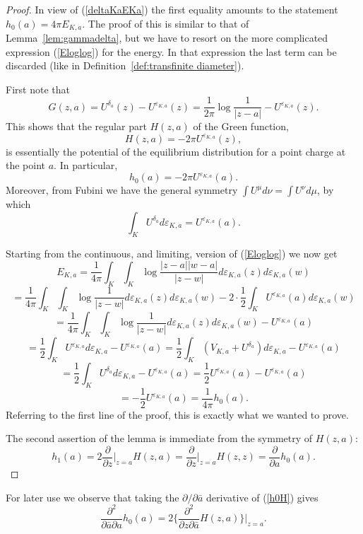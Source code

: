 \documentclass[reqno,12pt]{article}
\theoremstyle{plain}
\theoremstyle{definition}
\numberwithin{equation}{section}
\numberwithin{figure}{section}
\begin{document}
\begin{proof}
In view of (\ref{deltaKaEKa}) the first equality amounts to the statement $h_0(a)=4\pi E_{K,a}$.
The proof of this is similar to that of Lemma~\ref{lem:gammadelta}, but we have to resort on the more complicated
expression (\ref{Eloglog}) for the energy. 
In that expression the last term can be discarded (like in Definition~\ref{def:transfinite diameter}).

First note that
$$
G(z,a)=U^{\delta_a}(z)-U^{\varepsilon_{K,a}}(z)=\frac{1}{2\pi}\log \frac{1}{|z-a|}-U^{\varepsilon_{K,a}}(z).
$$
This shows that the regular part $H(z,a)$ of the Green function, 
\begin{equation}\label{HU}
H(z,a)=-2\pi U^{\varepsilon_{K,a}}(z),
\end{equation}
is essentially the potential of the equilibrium distribution for a point charge at the point $a$. In particular,
$$
h_0(a)=-2\pi U^{\varepsilon_{K,a}}(a).
$$
Moreover, from Fubini we have the general symmetry $\int U^\mu d\nu=\int U^\nu d\mu$, by which
$$
\int_K U^{\delta_a}d\varepsilon_{K,a}
=U^{\varepsilon_{K,a}}(a).
$$ 

Starting from the continuous, and limiting, version of (\ref{Eloglog}) we now get
$$
E_{K,a}=\frac{1}{4\pi}\int_K\int_K \log \frac{|z-a||w-a|}{|z-w|}d\varepsilon_{K,a}(z)d\varepsilon_{K,a}(w)
$$
$$
=\frac{1}{4\pi}\int_K\int_K \log \frac{1}{|z-w|}d\varepsilon_{K,a}(z)d\varepsilon_{K,a}(w)-2\cdot \frac{1}{2} \int_KU^{\varepsilon_{K,a}}(a)d\varepsilon_{K,a}(w)
$$
$$
=\frac{1}{4\pi}\int_K\int_K \log \frac{1}{|z-w|}d\varepsilon_{K,a}(z)d\varepsilon_{K,a}(w)-U^{\varepsilon_{K,a}}(a)
$$
$$
=\frac{1}{2}\int_K U^{\varepsilon_{K,a}}d\varepsilon_{K,a}-U^{\varepsilon_{K,a}}(a)
=\frac{1}{2}\int_K (V_{K,a}+ U^{\delta_a})d\varepsilon_{K,a}-U^{\varepsilon_{K,a}}(a)
$$
$$
=\frac{1}{2}\int_K U^{\delta_a}d\varepsilon_{K,a}-U^{\varepsilon_{K,a}}(a)=\frac{1}{2}U^{\varepsilon_{K,a}}(a)-U^{\varepsilon_{K,a}}(a)
$$
$$
=-\frac{1}{2}U^{\varepsilon_{K,a}}(a)=\frac{1}{4\pi}h_0(a).
$$ 
Referring to the first line of the proof, this is exactly what we wanted to prove.

The second assertion of the lemma is immediate from the symmetry of $H(z,a)$:
\begin{equation}\label{h0H}
h_1(a)=2\frac{\partial}{\partial z}\big|_{z=a}H(z,a)=\frac{\partial}{\partial z}\big|_{z=a}H(z,z)=\frac{\partial}{\partial a}h_0(a).
\end{equation}
\end{proof}

For later use we observe that taking the $\partial/\partial \bar{a}$ derivative of (\ref{h0H}) gives
\begin{equation}\label{h00H}
\frac{\partial^2}{\partial\bar{a}\partial a}h_0(a)=2\{\frac{\partial^2}{\partial z\partial \bar{a}}H(z,a)\}\big|_{z=a}.
\end{equation}
\end{document}
